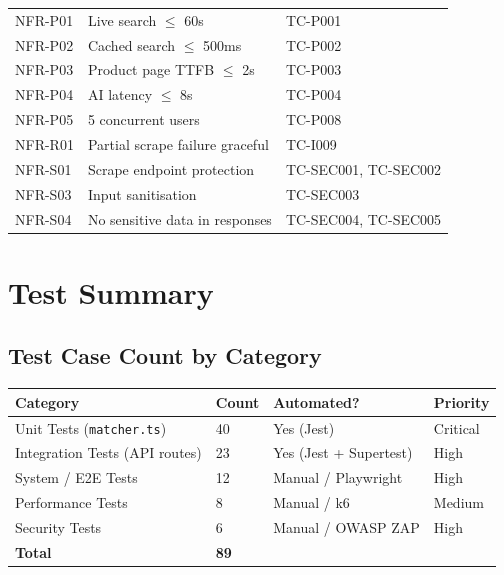 \documentclass[12pt,a4paper]{report}
\begin{document}
\begin{longtable}{L{2cm} L{5.5cm} L{6cm}}
  NFR-P01 & Live search $\leq$ 60s &
    TC-P001 \\[3pt]

  NFR-P02 & Cached search $\leq$ 500ms &
    TC-P002 \\[3pt]

  NFR-P03 & Product page TTFB $\leq$ 2s &
    TC-P003 \\[3pt]

  NFR-P04 & AI latency $\leq$ 8s &
    TC-P004 \\[3pt]

  NFR-P05 & 5 concurrent users &
    TC-P008 \\[3pt]

  NFR-R01 & Partial scrape failure graceful &
    TC-I009 \\[3pt]

  NFR-S01 & Scrape endpoint protection &
    TC-SEC001, TC-SEC002 \\[3pt]

  NFR-S03 & Input sanitisation &
    TC-SEC003 \\[3pt]

  NFR-S04 & No sensitive data in responses &
    TC-SEC004, TC-SEC005 \\[3pt]

\end{longtable}

\chapter{Test Summary}

\section{Test Case Count by Category}

\begin{longtable}{L{4cm} C{2cm} C{3cm} C{3cm}}
  \toprule
  \textbf{Category} & \textbf{Count} & \textbf{Automated?} & \textbf{Priority} \\
  \midrule
  \endhead
  \bottomrule
  \endlastfoot

  Unit Tests (\texttt{matcher.ts}) & 40 & Yes (Jest) & Critical \\
  Integration Tests (API routes)   & 23 & Yes (Jest + Supertest) & High \\
  System / E2E Tests               & 12 & Manual / Playwright & High \\
  Performance Tests                & 8  & Manual / k6 & Medium \\
  Security Tests                   & 6  & Manual / OWASP ZAP & High \\
  \midrule
  \textbf{Total} & \textbf{89} & & \\
  \bottomrule
\end{longtable}
\end{document}
